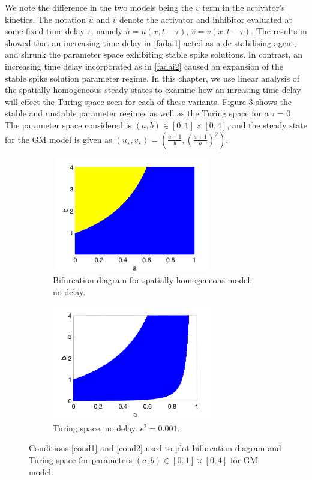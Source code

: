 We note the difference in the two models being the $v$ term in the activator's kinetics. The notation $\hat{u}$ and $\hat{v}$ denote the activator and inhibitor evaluated at some fixed time delay $\tau$, namely $\hat{u}=u(x,t-\tau)$, $\hat{v}=v(x,t-\tau)$. The results in \cite{fadai1,fadai2} showed that an increasing time delay in \eqref{fadai1} acted as a de-stabilising agent, and shrunk the parameter space exhibiting stable spike solutions. In contrast, an increasing time delay incorporated as in \eqref{fadai2} caused an expansion of the stable spike solution parameter regime. In this chapter, we use linear analysis of the spatially homogeneous steady states to examine how an inreasing time delay will effect the Turing space seen for each of these variants. Figure \ref{fig:gmspace} shows the stable and unstable parameter regimes as well as the Turing space for a $\tau=0$. The parameter space considered is $(a,b)\in[0,1]\times[0,4]$, and the steady state for the GM model is given as $(u_\star,v_\star)=\left(\frac{a+1}{b},\left(\frac{a+1}{b}\right)^2\right)$.

\begin{figure}[H]
    \centering
    \begin{subfigure}[t]{0.45\textwidth}
        \centering
        \includegraphics[width=7cm,height = 5cm]{bifgm.png}
        \caption{Bifurcation diagram for spatially homogeneous model, no delay.}
        \label{fig:bifgm}
    \end{subfigure}
    \hfill
    \begin{subfigure}[t]{0.45\textwidth}
        \centering
        \includegraphics[width=7cm,height = 5cm]{turingspacegm.png}
        \caption{Turing space, no delay. $\epsilon^2=0.001$.}
        \label{fig:turingspacegm}
    \end{subfigure}
    \caption{Conditions \eqref{cond1} and \eqref{cond2} used to plot bifurcation diagram and Turing space for parameters $(a,b)\in[0,1]\times[0,4]$ for GM model.}
    \label{fig:gmspace}
\end{figure}

